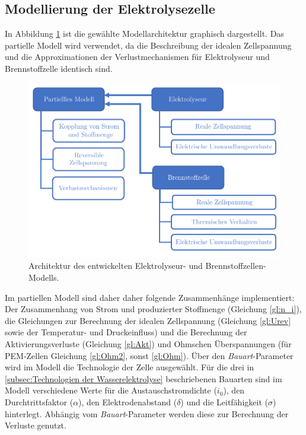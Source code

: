 \subsection{Modellierung der Elektrolysezelle}
\label{subsec:Modellierung der Zelle}
In Abbildung \ref{fig:Modellstruktur} ist die gewählte Modellarchitektur graphisch dargestellt. Das partielle Modell wird verwendet, da die Beschreibung der idealen Zellspannung und die Approximationen der Verlustmechanismen für Elektrolyseur und Brennstoffzelle identisch sind.
 
\begin{figure}[h]
	\centering
		\includegraphics[scale=1]{Figures/Modellstruktur}
		\caption{Architektur des entwickelten Elektrolyseur- und Brennstoffzellen-Modells.}
\label{fig:Modellstruktur}	
\end{figure}

Im partiellen Modell sind daher daher folgende Zusammenhänge implementiert: Der Zusammenhang von Strom und produzierter Stoffmenge (Gleichung \ref{gl:n_i}), die Gleichungen zur Berechnung der idealen Zellspannung (Gleichung \ref{gl:Urev} sowie der Temperatur- und Druckeinfluss) und die Berechnung der Aktivierungsverluste  (Gleichung  \ref{gl:Akt}) und Ohmschen Überspannungen (für PEM-Zellen Gleichung \ref{gl:Ohm2}, sonst \ref{gl:Ohm}). Über den \textit{Bauart}-Parameter wird im Modell die Technologie der Zelle ausgewählt.
Für die drei in \ref{subsec:Technologien der Wasserelektrolyse} beschriebenen Bauarten sind im Modell verschiedene Werte für die Austauschstromdichte ($i_0$), den Durchtrittsfaktor ($\alpha$), den Elektrodenabstand ($\delta$) und die Leitfähigkeit ($\sigma$) hinterlegt. Abhängig vom \textit{Bauart}-Parameter werden diese zur Berechnung der Verluste genutzt.\\

